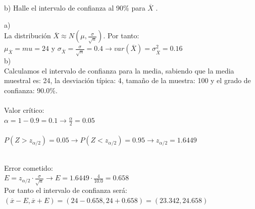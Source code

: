 \documentclass[spanish, 11pt]{exam}
\begin{document}
\begin{questions}
b) Halle el intervalo de confianza al 90\% para $\overline{X}$ .
 \begin{solution}   a) \\ La distribución $\overline{X} \approx N\left(\mu,\frac{\sigma}{\sqrt{n}}\right)$. Por tanto: \\ $\mu_{\overline{X}}=mu=24$ y $\sigma_{\overline{X}}=\frac{\sigma}{\sqrt{n}}=0.4 \to var({\overline{X}})=\sigma_{\overline{X}}^2=0.16$ \\ b) \\ Calculamos el intervalo de confianza para la media, sabiendo que la media muestral es: 24, la desviación típica: 4, tamaño de la muestra: 100 y el grado de confianza: 90.0\%. \\ \\ Valor crítico: \\ $\alpha=1-0.9=0.1\to \frac{\alpha}{2}=0.05$ \\ \\ $P(Z>z_{\alpha/2})=0.05\to P(Z<z_{\alpha/2})=0.95 \to z_{\alpha/2} =1.6449$ \\ 
     \\
    Error cometido: \\ $E=z_{\alpha/2}\cdot \frac{\sigma}{\sqrt{n}} \to E=1.6449\cdot \frac{4}{10.0}=0.658$ \\ Por tanto el intervalo de confianza será: \\$\left(\overline{x} - E , \overline{x} + E \right)=\left(24 - 0.658 , 24 + 0.658 \right)=\left(23.342, 24.658 \right)$ \\  \\ 
\end{solution}
\end{questions}
\end{document}
